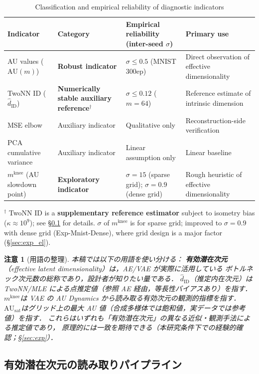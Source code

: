 \documentclass[11pt,a4paper]{jsarticle}
\newtheorem{remark}{注意}
\newcommand{\kap}{\kappa}
\newcommand{\AUsat}{\mathrm{AU}_{\mathrm{sat}}}
\newcommand{\mknee}{m^{\mathrm{knee}}}
\begin{document}
\begin{table}[H]
\centering
\caption{Classification and empirical reliability of diagnostic indicators}
\label{tab:indicator_class}
\small
\begin{tabular}{p{3.5cm}p{3.2cm}p{4.0cm}p{4.0cm}}
\toprule
Indicator & Category & Empirical reliability (inter-seed $\sigma$) & Primary use \\
\midrule
AU values ($\mathrm{AU}(m)$) & \textbf{Robust indicator} & $\sigma \leq 0.5$ (MNIST 300ep) & Direct observation of effective dimensionality \\
TwoNN ID ($\hat{d}_\mathrm{ID}$) & \textbf{Numerically stable auxiliary reference}$^\dagger$ & $\sigma \leq 0.12$ ($m=64$) & Reference estimate of intrinsic dimension \\
MSE elbow & Auxiliary indicator & Qualitative only & Reconstruction-side verification \\
PCA cumulative variance & Auxiliary indicator & Linear assumption only & Linear baseline \\
$\mknee$ (AU slowdown point) & \textbf{Exploratory indicator} & $\sigma=15$ (sparse grid); $\sigma=0.9$ (dense grid) & Rough heuristic of effective dimensionality \\
\bottomrule
\end{tabular}
\medskip
\footnotesize
$^\dagger$ TwoNN ID is a \textbf{supplementary reference estimator} subject to isometry bias ($\kap \approx 10^9$); see §\ref{sec:framework_pipeline} for details.
$\sigma$ of $\mknee$ is for sparse grid; improved to $\sigma=0.9$ with dense grid (Exp-Mnist-Dense), where grid design is a major factor (§\ref{sec:exp_el}).
\normalsize
\end{table}

\begin{remark}[用語の整理]
本稿では以下の用語を使い分ける：
\textbf{有効潜在次元}（effective latent dimensionality）は，AE/VAE が実際に活用している
ボトルネック次元数の総称であり，設計者が知りたい量である．
\textbf{$\hat{d}_\mathrm{ID}$}（推定内在次元）は TwoNN/MLE による点推定値（参照 AE 経由，等長性バイアスあり）を指す．
\textbf{$\mknee$}は VAE の AU Dynamics から読み取る有効次元の観測的指標を指す．
\textbf{$\AUsat$}はグリッド上の最大 AU 値（合成多様体では飽和値，実データでは参考値）を指す．
これらはいずれも「有効潜在次元」の異なる近似・観測手法による推定値であり，
原理的には一致を期待できる（本研究条件下での経験的確認；§\ref{sec:exp}）．
\end{remark}

\subsection{有効潜在次元の読み取りパイプライン}\label{sec:framework_pipeline}
\end{document}
